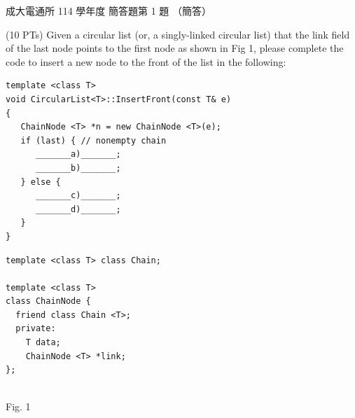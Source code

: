 \begin{pastexam}[label={px:ncku-114-cce-ds-17}]{成大電通所 114 學年度 簡答題第 1 題}
（簡答）

(10 PTs) Given a circular list (or, a singly-linked circular list) that the link field of the last node points to
the first node as shown in Fig 1, please complete the code to insert a new node to the front of the list in the
following:

\noindent\begin{minipage}[t]{0.55\linewidth}
\begin{verbatim}
template <class T>
void CircularList<T>::InsertFront(const T& e)
{
   ChainNode <T> *n = new ChainNode <T>(e);
   if (last) { // nonempty chain
      _______a)_______;
      _______b)_______;
   } else {
      _______c)_______;
      _______d)_______;
   }
}
\end{verbatim}
\end{minipage}\hfill
\begin{minipage}[t]{0.42\linewidth}
\begin{verbatim}
template <class T> class Chain;

template <class T>
class ChainNode {
  friend class Chain <T>;
  private:
    T data;
    ChainNode <T> *link;
};
\end{verbatim}
\end{minipage}

\begin{center}
\\
Fig. 1
\end{center}
\end{pastexam}

